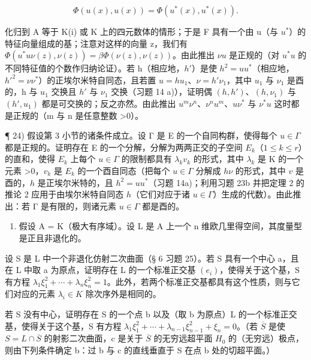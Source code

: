 \[
\Phi (u (x), u (x)) = \Phi (u ^ {*} (x), u ^ {*} (x)).
\]

  化归到 A 等于 K(i) 或 K 上的四元数体的情形；于是 F 具有一个由 u（与 \(u^{*}\)）的特征向量组成的基；注意对这样的向量 z，我们有 \(\Phi(u^{*}u\nu(z),\nu(z))=\beta\Phi(\nu(z),\nu(z))\)。由此推出 \(\nu u\) 是正规的（对 \(u^{*}u\) 的不同特征值的个数作归纳论证）。若 h（相应地，\(h'\)）是使 \(h^{2}=uu^{*}\)（相应地，\(h'^{2}=\nu\nu^{*}\)）的正埃尔米特自同态，且若置 \(u=hu_{1}\)、\(\nu=h'\nu_{1}\)，其中 \(u_{1}\) 与 \(\nu_{1}\) 是酉的，h 与 \(u_{1}\) 交换且 \(h'\) 与 \(\nu_{1}\) 交换（习题 14 a)），证明偶 \((h,h')\)、\((h,\nu_{1})\) 与 \((h',u_{1})\) 都是可交换的；反之亦然。由此推出 \(u^{m}\nu^{n}\)、\(\nu^{n}u^{m}\)、\(u\nu^{*}\) 与 \(\nu^{*}u\) 这时都是正规的（m 与 n 是任意整数 \textgreater0）。

¶ 24) 假设第 3 小节的诸条件成立。设 Γ 是 E 的一个自同构群，使得每个 \(u \in \Gamma\) 都是正规的。证明存在 E 的一个分解，分解为两两正交的子空间 \(E_k\)（\(1 \leqslant k \leqslant r\)）的直和，使得 \(E_k\) 上每个 \(u \in \Gamma\) 的限制都具有 \(\lambda_k v_k\) 的形式，其中 \(\lambda_k\) 是 K 的一个元素 \textgreater0，\(v_k\) 是 \(E_k\) 的一个酉自同态（把每个 \(u \in \Gamma\) 分解成 \(h\nu\) 的形式，其中 \(v\) 是酉的，\(h\) 是正埃尔米特的，且 \(h^2 = uu^*\)（习题 14a)；利用习题 23b 并把定理 2 的推论 2 应用于由埃尔米特自同态 \(h\)（它们对应于诸 \(u \in \Gamma\)）生成的代数）。由此推出：若 Γ 是有限的，则诸元素 \(u \in \Gamma\) 都是酉的。

\begin{enumerate}
\def\labelenumi{\arabic{enumi})}
\setcounter{enumi}{24}
\tightlist
\item
  假设 A = K（极大有序域）。设 L 是 A 上一个 n 维欧几里得空间，其度量型是正且非退化的。
\end{enumerate}

  设 S 是 L 中一个非退化仿射二次曲面（§ 6 习题 25）。若 S 具有一个中心 a，且在 L 中取 a 为原点，证明存在 L 的一个标准正交基 \((e_{i})\)，使得关于这个基，S 有方程 \(\lambda_{1}\xi_{1}^{2} + \cdots + \lambda_{n}\xi_{n}^{2} = 1\)。此外，若两个标准正交基都具有这个性质，则与它们对应的元素 \(\lambda_{i} \in K\) 除次序外是相同的。

  若 S 没有中心，证明存在 S 的一个点 b 以及（取 b 为原点）L 的一个标准正交基，使得关于这个基，S 有方程 \(\lambda_{1}\xi_{1}^{2} + \cdots + \lambda_{n-1}\xi_{n-1}^{2} + \xi_{n} = 0\)。（若 \(\overline{S}\) 是使 \(S = L \cap \overline{S}\) 的射影二次曲面，c 是关于 \(\overline{S}\) 的无穷远超平面 \(H_{0}\) 的（无穷远）极点，则由下列条件确定 b：过 b 与 c 的直线垂直于 S 在点 b 处的切超平面。）


